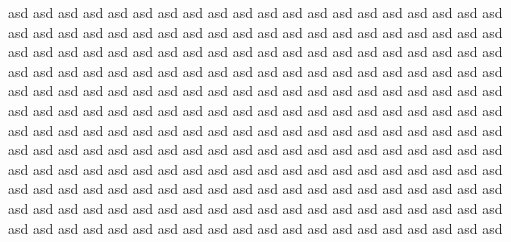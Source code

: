 \documentclass[11pt, a4paper]{awesome-cv}
\begin{document}
\makecvheader %
\makelettertitle %

\begin{cvletter}
asd asd asd asd asd asd asd asd asd asd asd asd asd asd asd asd asd asd asd asd asd asd asd asd asd asd asd asd asd asd asd asd asd asd asd asd asd asd asd asd asd asd asd asd asd asd asd asd asd asd asd asd asd asd asd asd asd asd asd asd asd asd asd asd asd asd asd asd asd asd asd asd asd asd asd asd asd asd asd asd 
asd asd asd asd asd asd asd asd asd asd asd asd asd asd asd asd asd asd asd asd asd asd asd asd asd asd asd asd asd asd asd asd asd asd asd asd asd asd asd asd asd asd asd asd asd asd asd asd asd asd asd asd asd asd asd asd asd asd asd asd asd asd asd asd asd asd asd asd asd asd asd asd asd asd asd asd asd asd asd asd 
asd asd asd asd asd asd asd asd asd asd asd asd asd asd asd asd asd asd asd asd asd asd asd asd asd asd asd asd asd asd asd asd asd asd asd asd asd asd asd asd asd asd asd asd asd asd asd asd asd asd asd asd asd asd asd asd asd asd asd asd asd asd asd asd asd asd asd asd asd asd asd asd asd asd asd asd asd asd asd asd 
\end{cvletter}

\makeletterclosing %
\end{document}

